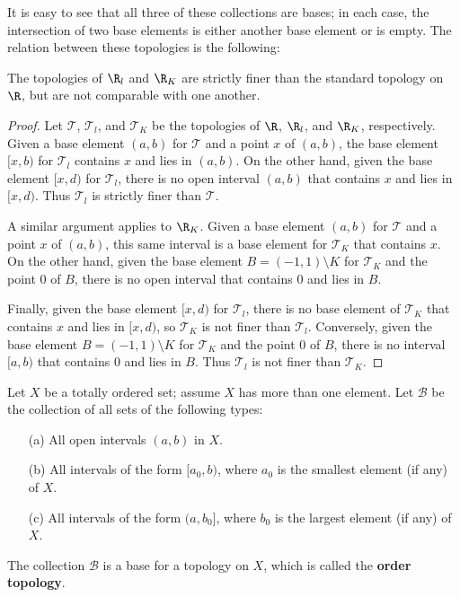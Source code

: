 It is easy to see that all three of these collections are bases; in each case, the intersection of two base elements is either another base element or is empty. The relation between these topologies is the following:
\begin{proposition}
The topologies of $\R_l$ and $\R_K$ are strictly finer than the standard topology on $\R$, but are not comparable with one another.
\end{proposition}
\begin{proof}
Let $\mathcal{T}$, $\mathcal{T}_l$, and $\mathcal{T}_K$ be the topologies of $\R$, $\R_l$, and $\R_K$, respectively. Given a base element $(a,b)$ for $\mathcal{T}$ and a point $x$ of $(a,b)$, the base element $[x,b)$ for $\mathcal{T}_l$ contains $x$ and lies in $(a,b)$. On the other hand, given the base element $[x,d)$ for $\mathcal{T}_l$, there is no open interval $(a,b)$ that contains $x$ and lies in $[x,d)$. Thus $\mathcal{T}_l$ is strictly finer than $\mathcal{T}$.\par
A similar argument applies to $\R_K$. Given a base element $(a,b)$ for $\mathcal{T}$ and a point $x$ of $(a,b)$, this same interval is a base element for $\mathcal{T}_K$ that contains $x$. On the other hand, given the base element $B=(-1,1)\setminus K$ for $\mathcal{T}_K$ and the point $0$ of $B$, there is no open interval that contains $0$ and lies in $B$.\par
Finally, given the base element $[x,d)$ for $\mathcal{T}_l$, there is no base element of $\mathcal{T}_K$ that contains $x$ and lies in $[x,d)$, so $\mathcal{T}_K$ is not finer than $\mathcal{T}_l$. Conversely, given the base element $B=(-1,1)\setminus K$ for $\mathcal{T}_K$ and the point $0$ of $B$, there is no interval $[a,b)$ that contains $0$ and lies in $B$. Thus $\mathcal{T}_l$ is not finer than $\mathcal{T}_K$.
\end{proof}
\begin{example}
Let $X$ be a totally ordered set; assume $X$ has more than one element. Let $\mathcal{B}$ be the collection of all sets of the following types:
\begin{itemize}
\item[(a)] All open intervals $(a,b)$ in $X$.
\item[(b)] All intervals of the form $[a_0,b)$, where $a_0$ is the smallest element (if any) of $X$.
\item[(c)] All intervals of the form $(a,b_0]$, where $b_0$ is the largest element (if any) of $X$.
\end{itemize}
The collection $\mathcal{B}$ is a base for a topology on $X$, which is called the \textbf{order topology}.
\end{example}
